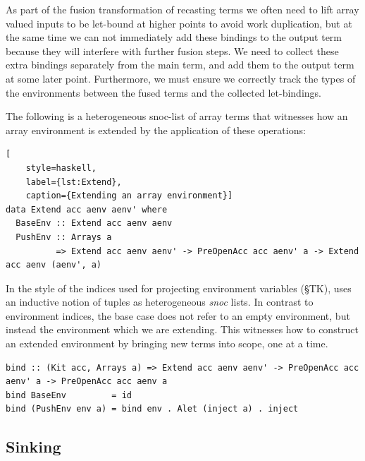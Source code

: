 As part of the fusion transformation of recasting terms we often need to lift
array valued inputs to be let-bound at higher points to avoid work duplication,
but at the same time we can not immediately add these bindings to the output
term because they will interfere with further fusion steps. We need to collect
these extra bindings separately from the main term, and add them to the output
term at some later point. Furthermore, we must ensure we correctly track the
types of the environments between the fused terms and the collected
let-bindings.

The following is a heterogeneous snoc-list of array terms that witnesses how an
array environment is extended by the application of these operations:
%
\begin{lstlisting}[
    style=haskell,
    label={lst:Extend},
    caption={Extending an array environment}]
data Extend acc aenv aenv' where
  BaseEnv :: Extend acc aenv aenv
  PushEnv :: Arrays a
          => Extend acc aenv aenv' -> PreOpenAcc acc aenv' a -> Extend acc aenv (aenv', a)
\end{lstlisting}
%
In the style of the  indices used for projecting environment
variables (\S TK),  uses an inductive notion of tuples as
heterogeneous \emph{snoc} lists. In contrast to environment indices, the base
case does not refer to an empty environment, but instead the environment
 which we are extending. This witnesses how to construct an extended
environment  by bringing new terms into scope, one at a time.
%
\begin{lstlisting}[style=haskell]
bind :: (Kit acc, Arrays a) => Extend acc aenv aenv' -> PreOpenAcc acc aenv' a -> PreOpenAcc acc aenv a
bind BaseEnv         = id
bind (PushEnv env a) = bind env . Alet (inject a) . inject
\end{lstlisting}


\subsection{Sinking}
\label{sec:sinking}

